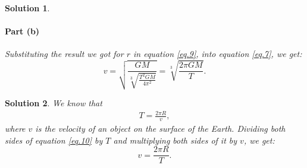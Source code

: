 \documentclass[a4paper]{report}
\newtheorem{solution}{Solution}
\begin{document}
\begin{solution}
\paragraph*{Part (b)} 
Substituting the result we got for $r$ in equation \ref{eq.9}, into equation \ref{eq.7}, we get:
$$v={\sqrt{\frac{GM}{\sqrt[3]{\frac{T^2GM}{4\pi^2}}}}}=\boxed{\sqrt[3]{\frac{2\pi GM}{T}}}.$$
\end{solution}
\begin{solution} \normalfont
  We know that 
  \begin{align} \label{eq.10}
    T=\frac{2\pi R}{v},
  \end{align} where $v$ is the velocity of an object on the surface of the Earth.
  Dividing both sides of equation \ref{eq.10} by $T$ and multiplying both sides of it by $v$, we get:
  $$v=\boxed{\frac{2\pi R}{T}}.$$
\end{solution}
\end{document}
